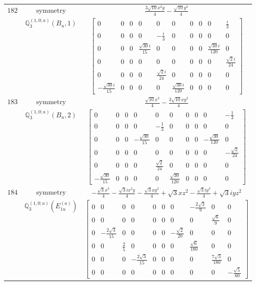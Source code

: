 \documentclass[fleqn,8pt,landscape]{jsarticle}
\begin{document}
\begin{longtable}{ccc}
$ 182 $ & $ \text{symmetry} $ & $ \frac{3 \sqrt{10} x^{2} y}{4} - \frac{\sqrt{10} y^{3}}{4} $ \\
$  $ & $ \mathbb{Q}_{3}^{(1,0;a)}(B_{u},1) $ & $ \begin{bmatrix} 0 & 0 & 0 & 0 & 0 & 0 & 0 & 0 & 0 & \frac{i}{3} \\ 0 & 0 & 0 & 0 & - \frac{i}{3} & 0 & 0 & 0 & 0 & 0 \\ 0 & 0 & 0 & \frac{\sqrt{30} i}{15} & 0 & 0 & 0 & 0 & \frac{\sqrt{30} i}{120} & 0 \\ 0 & 0 & 0 & 0 & 0 & 0 & 0 & 0 & 0 & \frac{\sqrt{2} i}{24} \\ 0 & 0 & 0 & 0 & \frac{\sqrt{2} i}{24} & 0 & 0 & 0 & 0 & 0 \\ - \frac{\sqrt{30} i}{15} & 0 & 0 & 0 & 0 & \frac{\sqrt{30} i}{120} & 0 & 0 & 0 & 0 \end{bmatrix} $ \\ \hline
$ 183 $ & $ \text{symmetry} $ & $ \frac{\sqrt{10} x^{3}}{4} - \frac{3 \sqrt{10} x y^{2}}{4} $ \\
$  $ & $ \mathbb{Q}_{3}^{(1,0;a)}(B_{u},2) $ & $ \begin{bmatrix} 0 & 0 & 0 & 0 & 0 & 0 & 0 & 0 & 0 & - \frac{1}{3} \\ 0 & 0 & 0 & 0 & - \frac{1}{3} & 0 & 0 & 0 & 0 & 0 \\ 0 & 0 & 0 & - \frac{\sqrt{30}}{15} & 0 & 0 & 0 & 0 & - \frac{\sqrt{30}}{120} & 0 \\ 0 & 0 & 0 & 0 & 0 & 0 & 0 & 0 & 0 & - \frac{\sqrt{2}}{24} \\ 0 & 0 & 0 & 0 & \frac{\sqrt{2}}{24} & 0 & 0 & 0 & 0 & 0 \\ - \frac{\sqrt{30}}{15} & 0 & 0 & 0 & 0 & \frac{\sqrt{30}}{120} & 0 & 0 & 0 & 0 \end{bmatrix} $ \\ \hline
$ 184 $ & $ \text{symmetry} $ & $ - \frac{\sqrt{3} x^{3}}{4} - \frac{\sqrt{3} i x^{2} y}{4} - \frac{\sqrt{3} x y^{2}}{4} + \sqrt{3} x z^{2} - \frac{\sqrt{3} i y^{3}}{4} + \sqrt{3} i y z^{2} $ \\
$  $ & $ \mathbb{Q}_{3}^{(1,0;a)}(E_{1u}^{(a)}) $ & $ \begin{bmatrix} 0 & 0 & 0 & 0 & 0 & 0 & 0 & - \frac{2 \sqrt{3}}{9} & 0 & 0 \\ 0 & 0 & 0 & 0 & 0 & 0 & 0 & 0 & \frac{\sqrt{6}}{9} & 0 \\ 0 & - \frac{2 \sqrt{3}}{15} & 0 & 0 & 0 & 0 & - \frac{\sqrt{2}}{20} & 0 & 0 & 0 \\ 0 & 0 & \frac{2}{5} & 0 & 0 & 0 & 0 & \frac{\sqrt{6}}{180} & 0 & 0 \\ 0 & 0 & 0 & - \frac{2 \sqrt{3}}{15} & 0 & 0 & 0 & 0 & \frac{7 \sqrt{3}}{180} & 0 \\ 0 & 0 & 0 & 0 & 0 & 0 & 0 & 0 & 0 & - \frac{\sqrt{5}}{60} \end{bmatrix} $ \\ \hline

\end{longtable}
\end{document}
